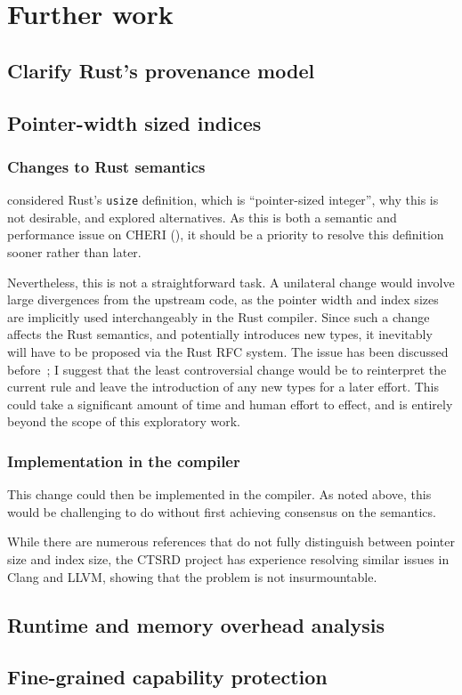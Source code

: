 \documentclass[dissertation.tex]{subfiles}
\begin{document}
\section{Further work}

\subsection{Clarify Rust's provenance model}

\subsection{Pointer-width sized indices}

\subsubsection{Changes to Rust semantics}
 considered Rust's \texttt{usize} definition, which
is ``pointer-sized integer'', why this is not desirable, and explored
alternatives.
As this is both a semantic and performance issue on CHERI
(), it should be a priority to resolve this
definition sooner rather than later.

Nevertheless, this is not a straightforward task.
A unilateral change would involve large divergences from the upstream
code, as the pointer width and index sizes are implicitly used
interchangeably in the Rust compiler.
Since such a change affects the Rust semantics, and potentially
introduces new types, it inevitably will have to be proposed via the
Rust RFC system.
The issue has been discussed before~\cite{rust-rfc-isize,rust-int-uint};
I suggest that the least controversial change would be to reinterpret
the current rule and leave the introduction of any new types for a later
effort.
This could take a significant amount of time and human effort to effect,
and is entirely beyond the scope of this exploratory work.

\subsubsection{Implementation in the compiler}
This change could then be implemented in the compiler.
As noted above, this would be challenging to do without first achieving
consensus on the semantics.

While there are numerous references that do not fully distinguish
between pointer size and index size, the CTSRD project has experience
resolving similar issues in Clang and LLVM, showing that the problem is
not insurmountable.

\subsection{Runtime and memory overhead analysis}

\subsection{Fine-grained capability protection}
\end{document}
